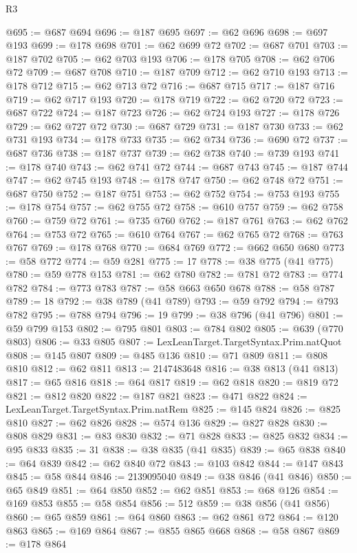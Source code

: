 \begin{lexlean}{R3}
\begin{coremodule}
@695 := @687 @694
@696 := @187 @695
@697 := @62 @696
@698 := @697 @193
@699 := @178 @698
@701 := @62 @699 @72
@702 := @687 @701
@703 := @187 @702
@705 := @62 @703 @193
@706 := @178 @705
@708 := @62 @706 @72
@709 := @687 @708
@710 := @187 @709
@712 := @62 @710 @193
@713 := @178 @712
@715 := @62 @713 @72
@716 := @687 @715
@717 := @187 @716
@719 := @62 @717 @193
@720 := @178 @719
@722 := @62 @720 @72
@723 := @687 @722
@724 := @187 @723
@726 := @62 @724 @193
@727 := @178 @726
@729 := @62 @727 @72
@730 := @687 @729
@731 := @187 @730
@733 := @62 @731 @193
@734 := @178 @733
@735 := @62 @734
@736 := @690 @72
@737 := @687 @736
@738 := @187 @737
@739 := @62 @738
@740 := @739 @193
@741 := @178 @740
@743 := @62 @741 @72
@744 := @687 @743
@745 := @187 @744
@747 := @62 @745 @193
@748 := @178 @747
@750 := @62 @748 @72
@751 := @687 @750
@752 := @187 @751
@753 := @62 @752
@754 := @753 @193
@755 := @178 @754
@757 := @62 @755 @72
@758 := @610 @757
@759 := @62 @758
@760 := @759 @72
@761 := @735 @760
@762 := @187 @761
@763 := @62 @762
@764 := @753 @72
@765 := @610 @764
@767 := @62 @765 @72
@768 := @763 @767
@769 := @178 @768
@770 := @684 @769
@772 := @662 @650 @680
@773 := @58 @772
@774 := @59 @281
@775 := 17
@778 := @38 @775 (@41 @775)
@780 := @59 @778 @153
@781 := @62 @780
@782 := @781 @72
@783 := @774 @782
@784 := @773 @783
@787 := @58 @663 @650 @678
@788 := @58 @787
@789 := 18
@792 := @38 @789 (@41 @789)
@793 := @59 @792
@794 := @793 @782
@795 := @788 @794
@796 := 19
@799 := @38 @796 (@41 @796)
@801 := @59 @799 @153
@802 := @795 @801
@803 := @784 @802
@805 := @639 (@770 @803)
@806 := @33 @805
@807 := LexLeanTarget.TargetSyntax.Prim.natQuot
@808 := @145 @807
@809 := @485 @136
@810 := @71 @809
@811 := @808 @810
@812 := @62 @811
@813 := 2147483648
@816 := @38 @813 (@41 @813)
@817 := @65 @816
@818 := @64 @817
@819 := @62 @818
@820 := @819 @72
@821 := @812 @820
@822 := @187 @821
@823 := @471 @822
@824 := LexLeanTarget.TargetSyntax.Prim.natRem
@825 := @145 @824
@826 := @825 @810
@827 := @62 @826
@828 := @574 @136
@829 := @827 @828
@830 := @808 @829
@831 := @83 @830
@832 := @71 @828
@833 := @825 @832
@834 := @95 @833
@835 := 31
@838 := @38 @835 (@41 @835)
@839 := @65 @838
@840 := @64 @839
@842 := @62 @840 @72
@843 := @103 @842
@844 := @147 @843
@845 := @58 @844
@846 := 2139095040
@849 := @38 @846 (@41 @846)
@850 := @65 @849
@851 := @64 @850
@852 := @62 @851
@853 := @68 @126
@854 := @169 @853
@855 := @58 @854
@856 := 512
@859 := @38 @856 (@41 @856)
@860 := @65 @859
@861 := @64 @860
@863 := @62 @861 @72
@864 := @120 @863
@865 := @169 @864
@867 := @855 @865 @668
@868 := @58 @867
@869 := @178 @864

\end{coremodule}
\end{lexlean}
